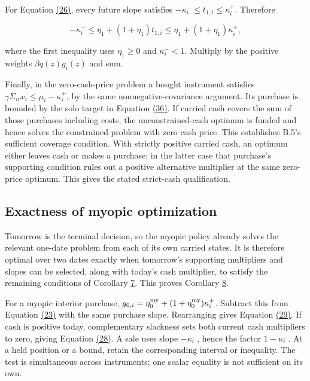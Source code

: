 \documentclass[11pt]{article}
\begin{document}
For Equation \hyperref[eq:26]{(26)}, every future slope satisfies \(-\kappa_i^-\leq t_{1,i}\leq\kappa_i^+\). Therefore

\begin{equation*}
-\kappa_i^-\leq\eta_1+(1+\eta_1)t_{1,i}
\leq\eta_1+(1+\eta_1)\kappa_i^+,
\end{equation*}

where the first inequality uses \(\eta_1\geq0\) and \(\kappa_i^-<1\). Multiply by the positive weights \(\beta q(z)g_i(z)\) and sum.

Finally, in the zero-cash-price problem a bought instrument satisfies \(\gamma\Sigma_{ii}x_i\leq\mu_i-\kappa_i^+\), by the same nonnegative-covariance argument. Its purchase is bounded by the solo target in Equation \hyperref[eq:36]{(36)}. If carried cash covers the sum of those purchases including costs, the unconstrained-cash optimum is funded and hence solves the constrained problem with zero cash price. This establishes B.5's sufficient coverage condition. With strictly positive carried cash, an optimum either leaves cash or makes a purchase; in the latter case that purchase's supporting condition rules out a positive alternative multiplier at the same zero-price optimum. This gives the stated strict-cash qualification.

\subsection{Exactness of myopic optimization}\label{sec:D.7}

Tomorrow is the terminal decision, so the myopic policy already solves the relevant one-date problem from each of its own carried states. It is therefore optimal over two dates exactly when tomorrow's supporting multipliers and slopes can be selected, along with today's cash multiplier, to satisfy the remaining conditions of Corollary \hyperref[res:Corollary-7]{7}. This proves Corollary \hyperref[res:Corollary-8]{8}.

For a myopic interior purchase, \(g_{0,i}=\eta_0^{\rm my}+(1+\eta_0^{\rm my})\kappa_i^+\). Subtract this from Equation \hyperref[eq:23]{(23)} with the same purchase slope. Rearranging gives Equation \hyperref[eq:29]{(29)}. If cash is positive today, complementary slackness sets both current cash multipliers to zero, giving Equation \hyperref[eq:28]{(28)}. A sale uses slope \(-\kappa_i^-\), hence the factor \(1-\kappa_i^-\). At a held position or a bound, retain the corresponding interval or inequality. The test is simultaneous across instruments; one scalar equality is not sufficient on its own.
\end{document}
